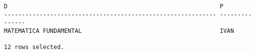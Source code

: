 \documentclass[11pt]{report}
\begin{document}
\begin{itemize}
\begin{verbatim}
D                                                            P                                                                                                                      
------------------------------------------------------------ ---------------                                                          
MATEMATICA FUNDAMENTAL                                       IVAN                                                                                                                   

12 rows selected.
  \end{verbatim}
\end{itemize}
\end{document}
